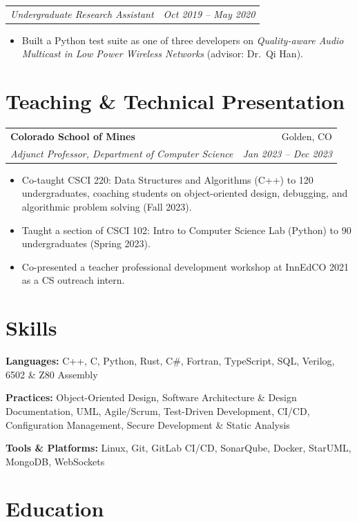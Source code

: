 \documentclass[letterpaper,10pt]{article}
\makeatletter
\newcommand{\entry}[4]{%
  \begin{tabularx}{\linewidth}{@{}X r@{}}
    \textbf{#1} & #2 \\
    \textit{#3} & \textit{\small #4} \\
  \end{tabularx}\vspace{-2pt}%
}
\newcommand{\subentry}[2]{%
  \begin{tabularx}{\linewidth}{@{}X r@{}}
    \textit{#1} & \textit{\small #2} \\
  \end{tabularx}\vspace{-2pt}%
}
\newcommand{\skillrow}[2]{\textbf{#1:} #2\par\vspace{1pt}}
\makeatother
\begin{document}
\subentry{Undergraduate Research Assistant}{Oct 2019 -- May 2020}
\begin{itemize}
  \item Built a Python test suite as one of three developers on \textit{Quality-aware Audio Multicast in Low Power
        Wireless Networks} (advisor: Dr.\ Qi Han).
\end{itemize}

\section{Teaching \& Technical Presentation}

\entry{Colorado School of Mines}{Golden, CO}{Adjunct Professor, Department of Computer Science}{Jan 2023 -- Dec 2023}
\begin{itemize}
  \item Co-taught CSCI 220: Data Structures and Algorithms (C++) to 120 undergraduates, coaching students on
        object-oriented design, debugging, and algorithmic problem solving (Fall 2023).
  \item Taught a section of CSCI 102: Intro to Computer Science Lab (Python) to 90 undergraduates (Spring 2023).
  \item Co-presented a teacher professional development workshop at InnEdCO 2021 as a CS outreach intern.
\end{itemize}

\section{Skills}
\skillrow{Languages}{C++, C, Python, Rust, C\#, Fortran, TypeScript, SQL, Verilog, 6502 \& Z80 Assembly}
\skillrow{Practices}{Object-Oriented Design, Software Architecture \& Design Documentation, UML, Agile/Scrum,
  Test-Driven Development, CI/CD, Configuration Management, Secure Development \& Static Analysis}
\skillrow{Tools \& Platforms}{Linux, Git, GitLab CI/CD, SonarQube, Docker, StarUML, MongoDB, WebSockets}

\section{Education}
\end{document}
